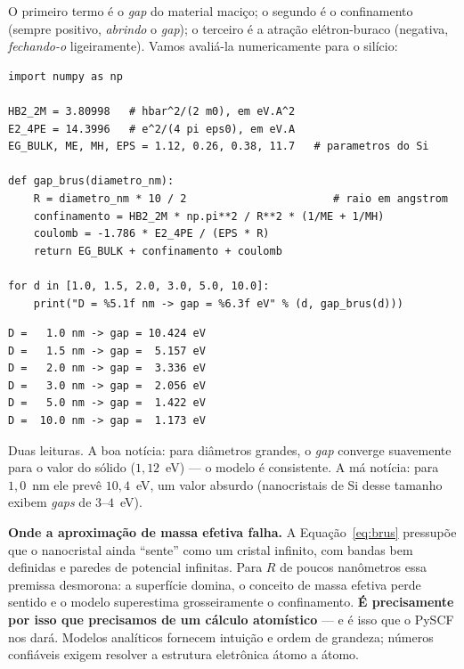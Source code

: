 \documentclass[11pt,a4paper,openany]{book}
\newcommand{\pyscf}{\textsf{PySCF}}
\begin{document}
\noindent
O primeiro termo é o \emph{gap} do material maciço; o segundo é o confinamento
(sempre positivo, \emph{abrindo} o \emph{gap}); o terceiro é a atração
elétron-buraco (negativa, \emph{fechando-o} ligeiramente). Vamos avaliá-la
numericamente para o silício:

\begin{lstlisting}[style=python,caption={A equação de Brus aplicada ao silício.},label={lst:brus}]
import numpy as np

HB2_2M = 3.80998   # hbar^2/(2 m0), em eV.A^2
E2_4PE = 14.3996   # e^2/(4 pi eps0), em eV.A
EG_BULK, ME, MH, EPS = 1.12, 0.26, 0.38, 11.7   # parametros do Si

def gap_brus(diametro_nm):
    R = diametro_nm * 10 / 2                       # raio em angstrom
    confinamento = HB2_2M * np.pi**2 / R**2 * (1/ME + 1/MH)
    coulomb = -1.786 * E2_4PE / (EPS * R)
    return EG_BULK + confinamento + coulomb

for d in [1.0, 1.5, 2.0, 3.0, 5.0, 10.0]:
    print("D = %5.1f nm -> gap = %6.3f eV" % (d, gap_brus(d)))
\end{lstlisting}

\begin{lstlisting}[style=console]
D =   1.0 nm -> gap = 10.424 eV
D =   1.5 nm -> gap =  5.157 eV
D =   2.0 nm -> gap =  3.336 eV
D =   3.0 nm -> gap =  2.056 eV
D =   5.0 nm -> gap =  1.422 eV
D =  10.0 nm -> gap =  1.173 eV
\end{lstlisting}

\noindent
Duas leituras. A boa notícia: para diâmetros grandes, o \emph{gap} converge
suavemente para o valor do sólido ($1{,}12$~eV) --- o modelo é consistente. A má
notícia: para $1{,}0$~nm ele prevê $10{,}4$~eV, um valor absurdo (nanocristais de
Si desse tamanho exibem \emph{gaps} de $3$--$4$~eV).

\begin{caixaatencao}
\textbf{Onde a aproximação de massa efetiva falha.} A Equação~\ref{eq:brus}
pressupõe que o nanocristal ainda ``sente'' como um cristal infinito, com bandas
bem definidas e paredes de potencial infinitas. Para $R$ de poucos nanômetros
essa premissa desmorona: a superfície domina, o conceito de massa efetiva perde
sentido e o modelo superestima grosseiramente o confinamento. \textbf{É
precisamente por isso que precisamos de um cálculo atomístico} --- e é isso que o
\pyscf{} nos dará. Modelos analíticos fornecem intuição e ordem de grandeza;
números confiáveis exigem resolver a estrutura eletrônica átomo a átomo.
\end{caixaatencao}
\end{document}
